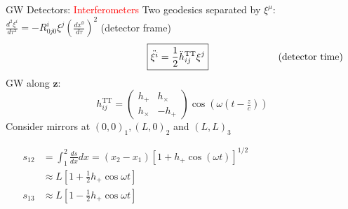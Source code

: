 \documentclass[xcolor=dvipsnames,handout,t]{beamer}
\newcommand{\todo}[1]{\textcolor{orange}{\texttt{TODO: #1}}}
\newcommand{\red}[1]{\textcolor{red}{#1}}
\begin{document}
 \begin{frame}{GW Detectors: \red{Interferometers}}
  Two geodesics separated by $\xi^\mu$:
$ \tfrac{d^2 \xi^i}{d\tau^2} = -R^i_{0j0} \xi^j\left(\tfrac{dx^0}{d\tau}\right)^2$ \hfill (detector frame)\\
\vspace{-3mm}
\[
\hspace{4.5cm} \boxed{\ddot{\xi^i} = \frac{1}{2} \ddot{h}_{ij}^\text{TT} \xi^j} \hspace{2.5cm} \text{(detector time)}
\]
%
%
GW along $\mathbf{z}$: 
\[
 h_{ij}^\text{TT} = \left(\begin{array}{cc}
                           h_+ & h_\times \\
                           h_\times & - h_+
                          \end{array}\right) \cos\left(\omega\left( t-\tfrac{z}{c}\right)\right)
\]
Consider mirrors at $(0,0)_1, (L,0)_2$ and $(L,L)_3$
\begin{small}
\begin{align*}
  s_{12} &= \int_1^2 \tfrac{ds}{dx}dx = (x_2-x_1) \left[ 1 + h_+ \cos(\omega t)\right]^{1/2}\hspace{4cm} \\
			      & \approx L \left[ 1+\tfrac{1}{2} h_+ \cos\omega t \right] \\
s_{13} &\approx L \left[ 1-\tfrac{1}{2} h_+ \cos\omega t \right]
\end{align*}
\end{small}
%
 \end{frame}
 
 
\end{document}
